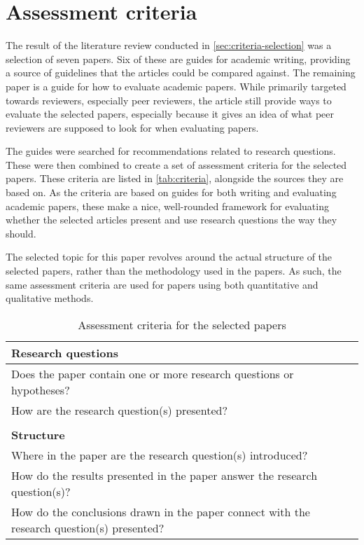 \section{Assessment criteria}
\label{sec:criteria}

The result of the literature review conducted in \autoref{sec:criteria-selection} was a selection of seven papers. Six of these \parencite{Rosenfeldt_2000,Jha_2014,Lin_2012,Davidson_2012,Cuschieri_2019,Katz_2006} are guides for academic writing, providing a source of guidelines that the articles could be compared against. The remaining paper \parencite{Martenson_2016} is a guide for how to evaluate academic papers. While primarily targeted towards reviewers, especially peer reviewers, the article still provide ways to evaluate the selected papers, especially because it gives an idea of what peer reviewers are supposed to look for when evaluating papers.

The guides were searched for recommendations related to research questions. These were then combined to create a set of assessment criteria for the selected papers. These criteria are listed in \autoref{tab:criteria}, alongside the sources they are based on. As the criteria are based on guides for both writing and evaluating academic papers, these make a nice, well-rounded framework for evaluating whether the selected articles present and use research questions the way they should.

The selected topic for this paper revolves around the actual structure of the selected papers, rather than the methodology used in the papers. As such, the same assessment criteria are used for papers using both quantitative and qualitative methods.

\begin{table*}[ht]
    \centering
    \begin{tabular}{p{} p{}}
        \textbf{Research questions} \\
        \hline
        Does the paper contain one or more research questions or hypotheses? & \cite{Rosenfeldt_2000,Jha_2014,Lin_2012,Davidson_2012,Cuschieri_2019,Katz_2006,Martenson_2016} \\
        How are the research question(s) presented? & \cite{Rosenfeldt_2000,Jha_2014,Lin_2012,Davidson_2012,Cuschieri_2019,Katz_2006} \\
        \\
        
        \textbf{Structure} \\
        \hline
        Where in the paper are the research question(s) introduced? & \cite{Rosenfeldt_2000,Jha_2014,Lin_2012,Davidson_2012,Cuschieri_2019,Katz_2006} \\
        How do the results presented in the paper answer the research question(s)? & \cite{Jha_2014,Davidson_2012,Cuschieri_2019,Katz_2006,Martenson_2016} \\
        How do the conclusions drawn in the paper connect with the research question(s) presented? & \cite{Davidson_2012,Katz_2006,Martenson_2016} \\
    \end{tabular}
    \caption{Assessment criteria for the selected papers}
    \label{tab:criteria}
\end{table*}